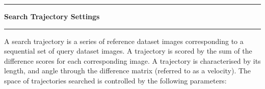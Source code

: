 \noindent\rule{\textwidth}{1pt}
\indent \textbf{Search Trajectory Settings}
\noindent\rule{\textwidth}{1pt}
\smallskip
\parbox{\textwidth}{A search trajectory is a series of reference dataset images corresponding to a sequential set of query dataset images. A trajectory is scored by the sum of the difference scores for each corresponding image. A trajectory is characterised by its length, and angle through the difference matrix (referred to as a velocity). The space of trajectories searched is controlled by the following parameters:}
